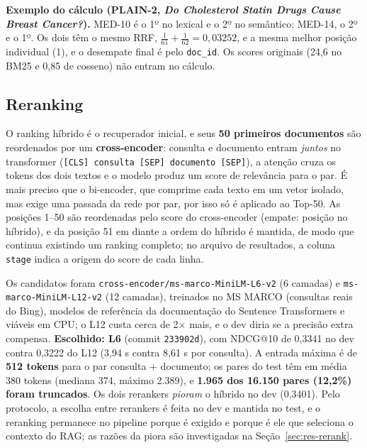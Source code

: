 \documentclass[10pt,a4paper]{article}
\newcommand{\med}[1]{\mbox{MED-#1}}         %
\newcommand{\pq}[1]{\mbox{PLAIN-#1}}        %
\begin{document}
\textbf{Exemplo do cálculo (\pq{2}, \emph{Do Cholesterol Statin Drugs Cause Breast Cancer?}).} \med{10} é o 1º no lexical e o 2º no semântico; \med{14}, o 2º e o 1º. Os dois têm o mesmo RRF, $\frac{1}{61} + \frac{1}{62} = 0{,}03252$, e a mesma melhor posição individual (1), e o desempate final é pelo \texttt{doc\_id}. Os scores originais (24,6 no BM25 e 0,85 de cosseno) não entram no cálculo.

\subsection{Reranking}

O ranking híbrido é o recuperador inicial, e seus \textbf{50 primeiros documentos} são reordenados por um \textbf{cross-encoder}: consulta e documento entram \emph{juntos} no transformer (\texttt{[CLS] consulta [SEP] documento [SEP]}), a atenção cruza os tokens dos dois textos e o modelo produz um score de relevância para o par. É mais preciso que o bi-encoder, que comprime cada texto em um vetor isolado, mas exige uma passada da rede por par, por isso só é aplicado ao Top-50. As posições 1--50 são reordenadas pelo score do cross-encoder (empate: posição no híbrido), e da posição 51 em diante a ordem do híbrido é mantida, de modo que continua existindo um ranking completo; no arquivo de resultados, a coluna \texttt{stage} indica a origem do score de cada linha.

Os candidatos foram \texttt{cross-encoder/ms-marco-MiniLM-L6-v2} (6 camadas) e \texttt{ms-marco-MiniLM-L12-v2} (12 camadas), treinados no MS MARCO (consultas reais do Bing), modelos de referência da documentação do Sentence Transformers e viáveis em CPU; o L12 custa cerca de 2$\times$ mais, e o dev diria se a precisão extra compensa. \textbf{Escolhido: L6} (commit \texttt{233902d}), com NDCG@10 de 0,3341 no dev contra 0,3222 do L12 (3,94 s contra 8,61 s por consulta). A entrada máxima é de \textbf{512 tokens} para o par consulta + documento; os pares do test têm em média 380 tokens (mediana 374, máximo 2.389), e \textbf{1.965 dos 16.150 pares (12,2\%) foram truncados}. Os dois rerankers \emph{pioram} o híbrido no dev (0,3401). Pelo protocolo, a escolha entre rerankers é feita no dev e mantida no test, e o reranking permanece no pipeline porque é exigido e porque é ele que seleciona o contexto do RAG; as razões da piora são investigadas na Seção~\ref{sec:res-rerank}.
\end{document}
